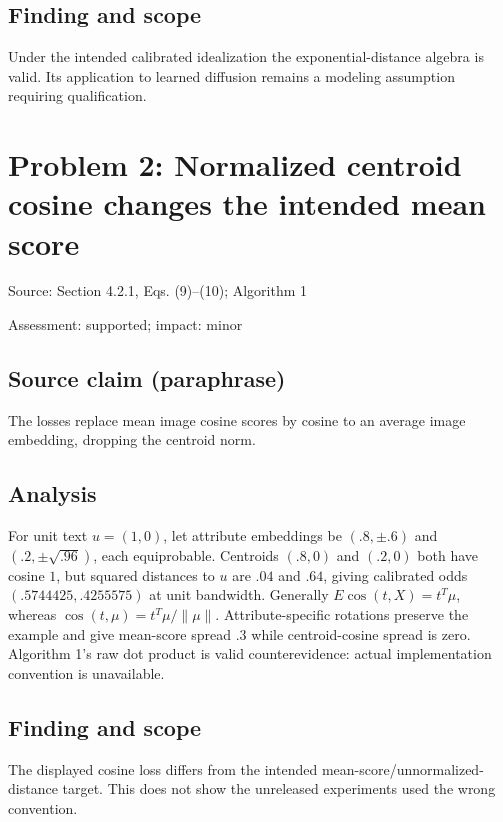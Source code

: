 \documentclass[11pt]{article}
\begin{document}
\subsection*{Finding and scope}

Under the intended calibrated idealization the exponential-distance algebra is valid. Its application to learned diffusion remains a modeling assumption requiring qualification.

\section*{Problem 2: Normalized centroid cosine changes the intended mean score}

Source: Section 4.2.1, Eqs. (9)–(10); Algorithm 1

Assessment: supported; impact: minor

\subsection*{Source claim (paraphrase)}

The losses replace mean image cosine scores by cosine to an average image embedding, dropping the centroid norm.

\subsection*{Analysis}

For unit text \(u=(1,0)\), let attribute embeddings be \((.8,\pm.6)\) and \((.2,\pm\sqrt{.96})\), each equiprobable. Centroids \((.8,0)\) and \((.2,0)\) both have cosine \(1\), but squared distances to \(u\) are \(.04\) and \(.64\), giving calibrated odds \((.5744425,.4255575)\) at unit bandwidth. Generally \(E\cos(t,X)=t^T\mu\), whereas \(\cos(t,\mu)=t^T\mu/\|\mu\|\). Attribute-specific rotations preserve the example and give mean-score spread \(.3\) while centroid-cosine spread is zero. Algorithm 1’s raw dot product is valid counterevidence: actual implementation convention is unavailable.

\subsection*{Finding and scope}

The displayed cosine loss differs from the intended mean-score/unnormalized-distance target. This does not show the unreleased experiments used the wrong convention.
\end{document}
